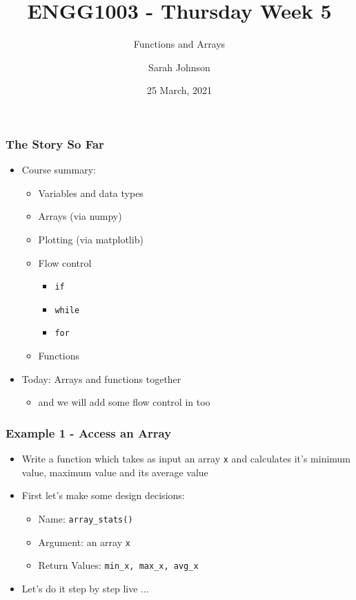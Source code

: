 \documentclass[english,14pt]{beamer}
\title{ENGG1003 - Thursday Week 5}
\subtitle{Functions and Arrays}
\author{Sarah Johnson}
\institute{University of Newcastle}
\date{25 March, 2021}
\begin{document}
\framebreak


\begin{frame}
\frametitle{The Story So Far}
\begin{itemize}
\item Course summary:
	\begin{itemize}
	\item Variables and data types  
		\item Arrays (via numpy)
		\item Plotting (via matplotlib)
		\item Flow control
			\begin{itemize}
				\item \texttt{if}
				\item \texttt{while}
				\item \texttt{for}
			\end{itemize}
		\item Functions
	\end{itemize}
\item Today: Arrays and functions together 
	\begin{itemize}
		\item and we will add some flow control in too
	\end{itemize}
\end{itemize}
\end{frame}

\begin{frame}
\frametitle{Example 1 - Access an Array}
\begin{itemize}
    \item Write a function which takes as input an array \texttt{x} and calculates it's minimum value, maximum value and its average value
    \item First let's make some design decisions:
	    \begin{itemize}
		    \item Name: \texttt{array\_stats()}
		    \item Argument: an array \texttt{x}
		    \item Return Values: \texttt{min\_x, max\_x, avg\_x} 
	    \end{itemize}
	\item Let's do it step by step live ...    
\end{itemize}
\end{frame}
\end{document}

